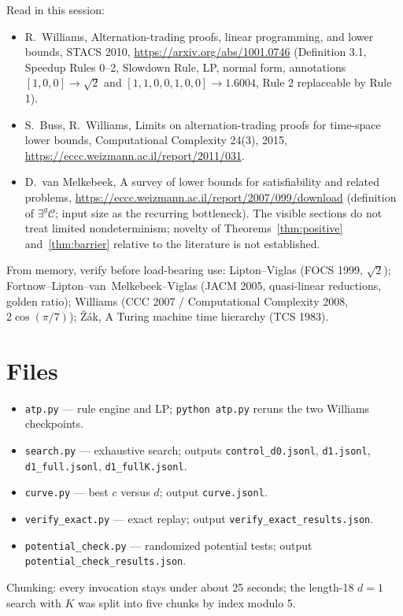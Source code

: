 \documentclass[11pt]{article}
\theoremstyle{definition}
\theoremstyle{remark}
\begin{document}
Read in this session:
\begin{itemize}
\item R.~Williams, Alternation-trading proofs, linear programming, and lower bounds, STACS 2010,
\url{https://arxiv.org/abs/1001.0746} (Definition 3.1, Speedup Rules 0--2, Slowdown Rule, LP, normal form,
annotations $[1,0,0]\to\sqrt2$ and $[1,1,0,0,1,0,0]\to1.6004$, Rule 2 replaceable by Rule 1).
\item S.~Buss, R.~Williams, Limits on alternation-trading proofs for time-space lower bounds,
Computational Complexity 24(3), 2015, \url{https://eccc.weizmann.ac.il/report/2011/031}.
\item D.~van Melkebeek, A survey of lower bounds for satisfiability and related problems,
\url{https://eccc.weizmann.ac.il/report/2007/099/download} (definition of $\exists^g\mathcal C$; input size as
the recurring bottleneck). The visible sections do not treat limited nondeterminism; novelty of
Theorems~\ref{thm:positive} and~\ref{thm:barrier} relative to the literature is not established.
\end{itemize}
From memory, verify before load-bearing use: Lipton--Viglas (FOCS 1999, $\sqrt2$);
Fortnow--Lipton--van~Melkebeek--Viglas (JACM 2005, quasi-linear reductions, golden ratio);
Williams (CCC 2007 / Computational Complexity 2008, $2\cos(\pi/7)$); \v{Z}\'ak, A Turing machine time hierarchy
(TCS 1983).

\section{Files}

\begin{itemize}
\item \texttt{atp.py} --- rule engine and LP; \texttt{python atp.py} reruns the two Williams checkpoints.
\item \texttt{search.py} --- exhaustive search; outputs \texttt{control\_d0.jsonl}, \texttt{d1.jsonl},
\texttt{d1\_full.jsonl}, \texttt{d1\_fullK.jsonl}.
\item \texttt{curve.py} --- best $c$ versus $d$; output \texttt{curve.jsonl}.
\item \texttt{verify\_exact.py} --- exact replay; output \texttt{verify\_exact\_results.json}.
\item \texttt{potential\_check.py} --- randomized potential tests; output
\texttt{potential\_check\_results.json}.
\end{itemize}
Chunking: every invocation stays under about 25 seconds; the length-18 $d=1$ search with $K$ was split into
five chunks by index modulo 5.
\end{document}
